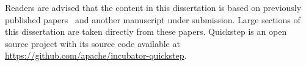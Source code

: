 Readers are advised that the content in this dissertation is based on previously published papers~\cite{DBLP:conf/bigdata/DeshmukhMP17, supplement, quickstep-system} and another manuscript under submission.
Large sections of this dissertation are taken directly from these papers. 
Quickstep is an open source project with its source code available at \url{https://github.com/apache/incubator-quickstep}.
